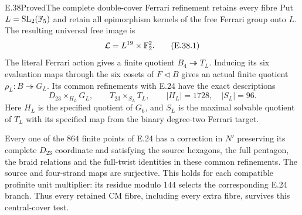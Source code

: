 \begin{statement}{E.38}{Proved}{The complete double-cover Ferrari refinement retains every fibre}
Put $L=\operatorname{SL}_2(\mathbb F_5)$ and retain all epimorphism
kernels of the free Ferrari group onto $L$.  The resulting
universal free image is
\[
             \mathcal L=L^{19}\times\mathbb F_2^2.
 \tag{E.38.1}
\]
The literal Ferrari action gives a finite quotient
$B_4\twoheadrightarrow T_L$.  Inducing its six evaluation
maps through the six cosets of $F\lhd B$ gives an actual
finite quotient $\rho_L:B\twoheadrightarrow G_L$.
Its common refinements with E.24 have the exact descriptions
\[
 D_{23}\mathbin{\times_{H_L}}G_L,
 \qquad
 T_{23}\mathbin{\times_{S_L}}T_L,
 \qquad |H_L|=1728,
 \quad |S_L|=96.
 \tag{E.38.2}
\]
Here $H_L$ is the specified quotient of $G_6$, and $S_L$
is the maximal solvable quotient of $T_L$ with its
specified map from the binary degree-two Ferrari target.

Every one of the $864$ finite points of E.24 has a correction
in $N'$ preserving its complete $D_{23}$ coordinate and
satisfying the source hexagons, the full pentagon, the braid
relations and the full-twist identities in these common
refinements.  The source and four-strand maps are surjective.
This holds for each compatible profinite unit multiplier:
its residue modulo $144$ selects the corresponding E.24
branch.  Thus every retained CM fibre, including every extra
fibre, survives this central-cover test.
\end{statement}
